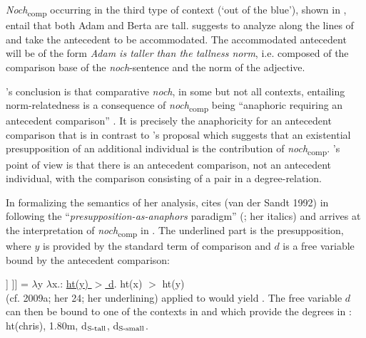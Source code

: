 \documentclass[output=paper
,modfonts
,nonflat]{langsci/langscibook}
\begin{document}
\textit{Noch}\textsubscript{comp} occurring in the third type of context (`out of the blue'), shown in , entail that both Adam and Berta are tall. \citeauthor{umbach2009a_comp} suggests to analyze  along the lines of  and take the antecedent to be accommodated. The accommodated antecedent will be of the form \textit{Adam is taller than the tallness norm}, i.e. composed of the comparison base of the \textit{noch}-sentence and the norm of the adjective.

\citeauthor{umbach2009a_comp}'s \citeyearpar{umbach2009a_comp} conclusion is that comparative \textit{noch}, in some but not all contexts, entailing norm-relatedness is a consequence of \textit{noch}\textsubscript{comp} being ``anaphoric requiring an antecedent comparison'' \citet[10]{umbach2009a_comp}. It is precisely the anaphoricity for an antecedent comparison that is in contrast to \citeauthor{koenig1977}'s \citeyearpar{koenig1977} proposal which suggests that an existential presupposition of an additional individual is the contribution of \textit{noch}\textsubscript{comp}. \citeauthor{umbach2009a_comp}'s \citeyearpar{umbach2009a_comp} point of view is that there is an antecedent comparison, not an antecedent individual, with the comparison consisting of a pair in a degree-relation.


In formalizing the semantics of her analysis, \citeauthor{umbach2009a_comp} cites (van der Sandt 1992) in following the ``\textit{presupposition-as-anaphors} paradigm'' (\citealt[11]{umbach2009a_comp}; her italics) and arrives at the interpretation of \textit{noch}\textsubscript{comp} in . The underlined part is the presupposition, where $y$ is provided by the standard term of comparison and $d$ is a free variable bound by the antecedent comparison:

\ea\relax [[ [$_{\textnormal{\footnotesize{AP}}}$ \textit{noch} [$_{\textnormal{\footnotesize{AP}}}$ \textit{größer} ]] ]] = $\lambda$y $\lambda$x.: \underline{ht(y) $>$ d}. ht(x) $>$ ht(y) \label{umbach's_meaning_of_noch} \\ (cf. \citeauthor{umbach2009a_comp} 2009a; her 24; her underlining)\z
{} applied to  would yield . The free variable $d$ can then be bound to one of the contexts in  and  which provide the degrees in : ht(chris), 1.80m, d$_{\textnormal{\scriptsize{S-tall}}}$, d$_{\textnormal{\scriptsize{S-small}}}$.
\end{document}
